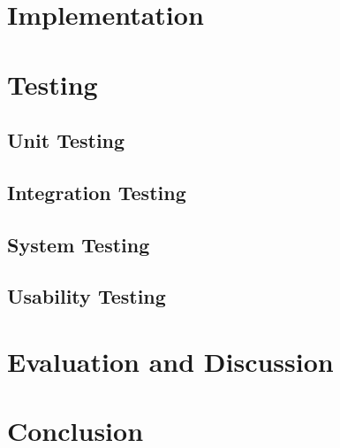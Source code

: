 \documentclass[11pt]{article}
\begin{document}
\section{Implementation} \label{implementation}

\section{Testing} \label{testing}

\subsection{Unit Testing} \label{unit-testing}

\subsection{Integration Testing} \label{integration-testing}

\subsection{System Testing} \label{system-testing}

\subsection{Usability Testing} \label{usability-testing}


\section{Evaluation and Discussion} \label{evaluation-discussion}

\section{Conclusion} \label{conclusion}


%
 
\end{document}

